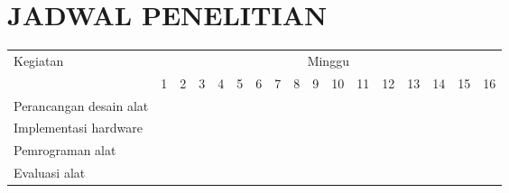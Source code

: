\chapter{JADWAL PENELITIAN}

\newcommand{\w}{}
\newcommand{\G}{\cellcolor{gray}}
\begin{table}[H]
  \label{tbl:timeline}
  \begin{tabular}{|p{3.5cm}|c|c|c|c|c|c|c|c|c|c|c|c|c|c|c|c|}

    \hline
    \multirow{2}{*}{Kegiatan} & \multicolumn{16}{|c|}{Minggu}                                                                       \\
    \cline{2-17}              &
    1                         & 2                             & 3  & 4  & 5  & 6  & 7  & 8  & 9  & 10 & 11 & 12 & 13 & 14 & 15 & 16 \\
    \hline

    Perancangan desain alat          &
    \G                        & \G                            & \w & \w & \w & \w & \w & \w & \w & \w & \w & \w & \w & \w & \w & \w \\
    \hline

    Implementasi hardware           &
    \w                        & \w                            & \G & \G & \G & \G & \G & \G & \w & \w & \w & \w & \w & \w & \w & \w \\
    \hline

    Pemrograman alat             &
    \w                        & \w                            & \w & \w & \w & \w & \w & \w & \G & \G & \G & \G & \G & \G & \w & \w \\
    \hline

    Evaluasi alat       &
    \w                        & \w                            & \w & \w & \w & \w & \w & \w & \w & \w & \w & \w & \G & \G & \G & \G \\
    \hline
  \end{tabular}
\end{table}

